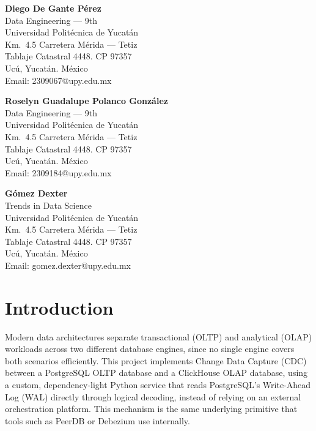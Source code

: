 \documentclass[11pt]{article}
\begin{document}
\begin{center}
\begin{minipage}[t]{0.30\textwidth}
\centering
\textbf{Diego De Gante P\'{e}rez } \\[0.2em]
Data Engineering --- 9th \\
Universidad Polit\'{e}cnica de Yucat\'{a}n \\
Km.\ 4.5 Carretera M\'{e}rida --- Tetiz \\
Tablaje Catastral 4448. CP 97357 \\
Uc\'{u}, Yucat\'{a}n. M\'{e}xico \\
Email: 2309067@upy.edu.mx
\end{minipage}
\hfill
\begin{minipage}[t]{0.30\textwidth}
\centering
\textbf{Roselyn Guadalupe Polanco Gonz\'{a}lez} \\[0.2em]
Data Engineering --- 9th \\
Universidad Polit\'{e}cnica de Yucat\'{a}n \\
Km.\ 4.5 Carretera M\'{e}rida --- Tetiz \\
Tablaje Catastral 4448. CP 97357 \\
Uc\'{u}, Yucat\'{a}n. M\'{e}xico \\
Email: 2309184@upy.edu.mx
\end{minipage}
\hfill
\begin{minipage}[t]{0.30\textwidth}
\centering
\textbf{G\'{o}mez Dexter} \\[0.2em]
Trends in Data Science \\
Universidad Polit\'{e}cnica de Yucat\'{a}n \\
Km.\ 4.5 Carretera M\'{e}rida --- Tetiz \\
Tablaje Catastral 4448. CP 97357 \\
Uc\'{u}, Yucat\'{a}n. M\'{e}xico \\
Email: gomez.dexter@upy.edu.mx
\end{minipage}

\end{center}

\vspace{1cm}

\section{Introduction}

Modern data architectures separate transactional (OLTP) and analytical (OLAP)
workloads across two different database engines, since no single engine
covers both scenarios efficiently. This project implements Change Data
Capture (CDC) between a PostgreSQL OLTP database and a ClickHouse OLAP
database, using a custom, dependency-light Python service that reads
PostgreSQL's Write-Ahead Log (WAL) directly through logical decoding,
instead of relying on an external orchestration platform. This mechanism
is the same underlying primitive that tools such as PeerDB or Debezium use
internally.
\end{document}
